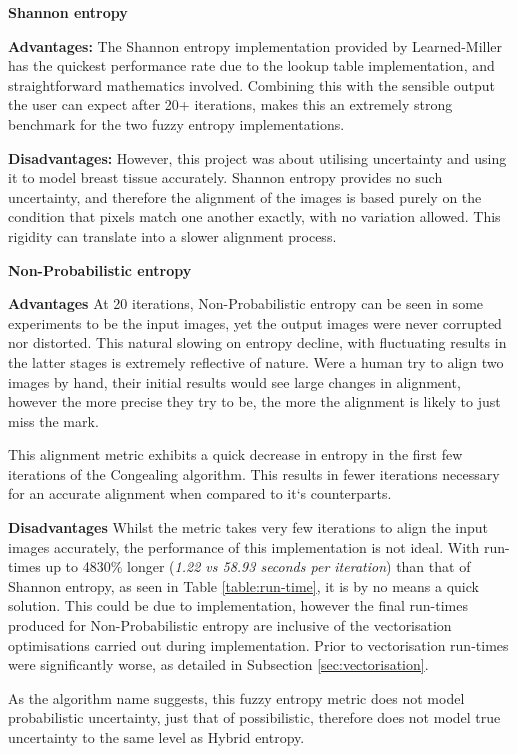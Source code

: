 \noindent \textbf{Shannon entropy}

\noindent \textbf{Advantages: }
The Shannon entropy implementation provided by Learned-Miller has the quickest performance rate due to the lookup table implementation, and straightforward mathematics involved. Combining this with the sensible output the user can expect after 20+ iterations, makes this an extremely strong benchmark for the two fuzzy entropy implementations.

\noindent \textbf{Disadvantages: }
However, this project was about utilising uncertainty and using it to model breast tissue accurately. Shannon entropy provides no such uncertainty, and therefore the alignment of the images is based purely on the condition that pixels match one another exactly, with no variation allowed. This rigidity can translate into a slower alignment process.

\vspace{1cm}
\noindent \textbf{Non-Probabilistic entropy}

\noindent \textbf{Advantages}
At 20 iterations, Non-Probabilistic entropy can be seen in some experiments to be  the input images, yet the output images were never corrupted nor distorted. This natural slowing on entropy decline, with fluctuating results in the latter stages is extremely reflective of nature. Were a human try to align two images by hand, their initial results would see large changes in alignment, however the more precise they try to be, the more the alignment is likely to just miss the mark.

This alignment metric exhibits a quick decrease in entropy in the first few iterations of the \Gls{Congealing} algorithm. This results in fewer iterations necessary for an accurate alignment when compared to it`s counterparts.

\noindent \textbf{Disadvantages}
Whilst the metric takes very few iterations to align the input images accurately, the performance of this implementation is not ideal. With run-times up to 4830\% longer (\textit{1.22 vs 58.93 seconds per iteration}) than that of Shannon entropy, as seen in Table \ref{table:run-time}, it is by no means a quick solution. This could be due to implementation, however the final run-times produced for Non-Probabilistic entropy are inclusive of the vectorisation optimisations carried out during implementation. Prior to vectorisation run-times were significantly worse, as detailed in Subsection \ref{sec:vectorisation}.

As the algorithm name suggests, this fuzzy entropy metric does not model probabilistic uncertainty, just that of possibilistic, therefore does not model true uncertainty to the same level as Hybrid entropy.

